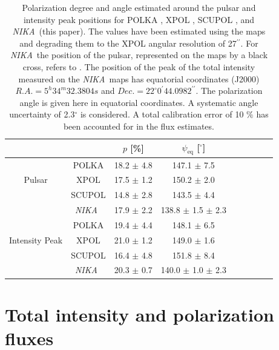 \documentclass[twocolumn,traditabstract]{aa}
\def\NIKA{\textit{NIKA}}
\begin{document}
\begin{table}[h!]
  \centering
      \begin{tabular}{ccccccccc}
     &  & \small $p$ [\%] & \small $\psi_{\textrm{eq}}$ [$^\circ$] & \\ 
\hline
\hline
      &\small POLKA  & \small 18.2 $\pm$ \small 4.8 & \small 147.1 $\pm$ \small 7.5  \\
      \small Pulsar &\small XPOL   & \small 17.5 $\pm$ \small 1.2 & \small 150.2 $\pm$ \small 2.0   \\
     &\small SCUPOL & \small 14.8 $\pm$ \small 2.8 & \small 143.5 $\pm$ \small 4.4 & \\
      &\small \NIKA\ & \small 17.9 $\pm$ \small 2.2 & \small 138.8 $\pm$ \small 1.5 $\pm$ \small 2.3 \\
      \hline

      &\small POLKA  & \small 19.4 $\pm$ \small 4.4 & \small 148.1 $\pm$ \small 6.5   \\
       \small Intensity Peak &\small XPOL  &  \small 21.0 $\pm$ 1.2 & \small 149.0 $\pm $ \small 1.6   \\
      &\small SCUPOL  & \small 16.4 $\pm$ 4.8 & \small 151.8 $\pm$ \small 8.4\\
      &\small \NIKA\ & \small 20.3 $\pm$ \small 0.7 & \small 140.0 $\pm$ \small 1.0 $\pm$ \small 2.3 \\
\hline
\hline
    \end{tabular}
   \caption{Polarization degree and angle estimated around the pulsar and intensity peak positions for POLKA \citep{2014PASP..126.1027W}, XPOL \citep{aumont2010}, SCUPOL \citep{scubapol}, and \NIKA\ (this paper). The values have been estimated using the maps and degrading  them to the XPOL angular resolution of 27$^{\prime\prime}$. For \NIKA\ the position of the pulsar, represented on the maps by a black cross, refers to \cite{Lobanov}. The position of the peak of the total intensity measured on the \NIKA\ maps has equatorial coordinates (J2000) $R.A. =5^h34^m32.3804s$ and $Dec. = 22^{\circ}0^{\prime}44.0982^{\prime\prime}$. The polarization angle is given here in equatorial coordinates. A systematic angle uncertainty of 2.3$^{\circ}$ is considered. A total calibration error of 10 $\%$ has been accounted for in the flux estimates.}
\label{tab:peak_pulsar_others}
 \end{table}

\section{Total intensity and polarization fluxes}\label{sec:Polarization estimates in CMB experiments like beams}
\end{document}
